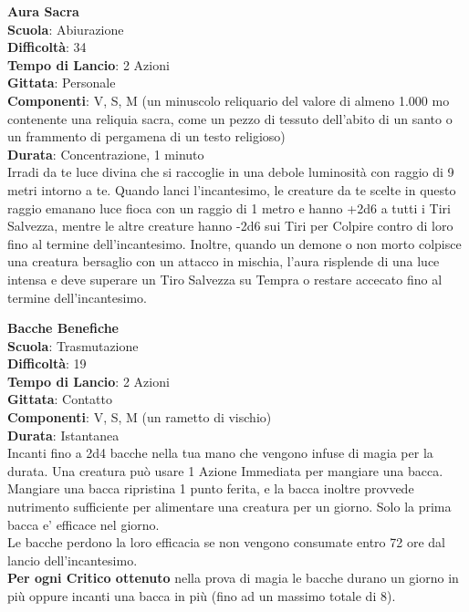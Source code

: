 \begin{multicols}{2}
\medskip\textbf{Aura Sacra}\\
\textbf{Scuola}: Abiurazione\\
\textbf{Difficoltà}: 34\\
\textbf{Tempo di Lancio}: 2 Azioni\\
\textbf{Gittata}: Personale\\
\textbf{Componenti}: V, S, M (un minuscolo reliquario del valore di almeno 1.000 mo contenente una reliquia sacra, come un pezzo di tessuto dell'abito di un santo o un frammento di pergamena di un testo religioso)\\
\textbf{Durata}: Concentrazione, 1 minuto\\
Irradi da te luce divina che si raccoglie in una debole luminosità con raggio di 9 metri intorno a te. Quando lanci l'incantesimo, le creature da te scelte in questo raggio emanano luce fioca con un raggio di 1 metro e hanno {+2d6} a tutti i Tiri Salvezza, mentre le altre creature hanno {-2d6} sui Tiri per Colpire contro di loro fino al termine dell'incantesimo. Inoltre, quando un demone o non morto colpisce una creatura bersaglio con un attacco in mischia, l'aura risplende di una luce intensa e deve superare un Tiro Salvezza su Tempra o restare accecato fino al termine dell'incantesimo.

\medskip\textbf{Bacche Benefiche}\\
\textbf{Scuola}: Trasmutazione\\
\textbf{Difficoltà}: 19\\
\textbf{Tempo di Lancio}: 2 Azioni\\
\textbf{Gittata}: Contatto\\
\textbf{Componenti}: V, S, M (un rametto di vischio)\\
\textbf{Durata}: Istantanea\\
Incanti fino a 2d4 bacche nella tua mano che vengono infuse di magia per la durata. Una creatura può usare 1 Azione Immediata per mangiare una bacca. Mangiare una bacca ripristina 1 punto ferita, e la bacca inoltre provvede nutrimento sufficiente per alimentare una creatura per un giorno. Solo la prima bacca e' efficace nel giorno.\\
Le bacche perdono la loro efficacia se non vengono consumate entro 72 ore dal lancio dell'incantesimo. \\
\textbf{Per ogni Critico ottenuto} nella prova di magia le bacche durano un giorno in più oppure incanti una bacca in più (fino ad un massimo totale di 8).


\end{multicols}
